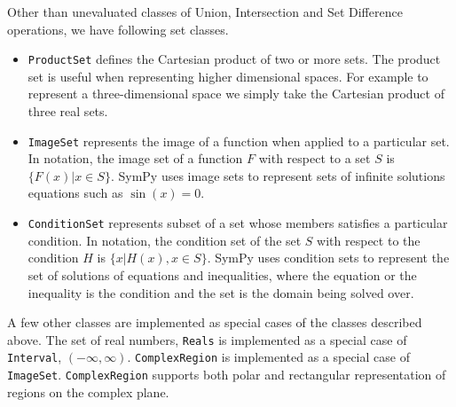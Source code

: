
Other than unevaluated classes of Union, Intersection and Set Difference
operations, we have following set classes.

\begin{itemize}

    \item \verb|ProductSet| defines the Cartesian product of two
        or more sets. The product set is useful when representing higher
        dimensional spaces. For example to represent a three-dimensional space
        we simply take the Cartesian product of three real sets.

      \item \verb|ImageSet| represents the image of a function when applied to
        a particular set. In notation, the image set of a function $F$ with
        respect to a set $S$ is $\{ F(x) | x \in S \}$. SymPy uses image sets
        to represent sets of infinite solutions equations such as $\sin(x)=0$.


      \item \verb|ConditionSet| represents subset of a set whose members
        satisfies a particular condition. In notation, the condition set of
        the set $S$ with respect to the condition $H$ is
        $\{x | H(x), x \in S \}$. SymPy uses condition sets to represent the
        set of solutions of equations and inequalities, where the equation or
        the inequality is the condition and the set is the domain being solved
        over.


\end{itemize}

A few other classes are implemented as special cases of the classes described
above. The set of real numbers, \verb|Reals| is implemented as a special case
of \verb|Interval|, $(-\infty, \infty)$. \verb|ComplexRegion| is implemented
as a special case of \verb|ImageSet|. \verb|ComplexRegion| supports both polar
and rectangular representation of regions on the complex plane.
